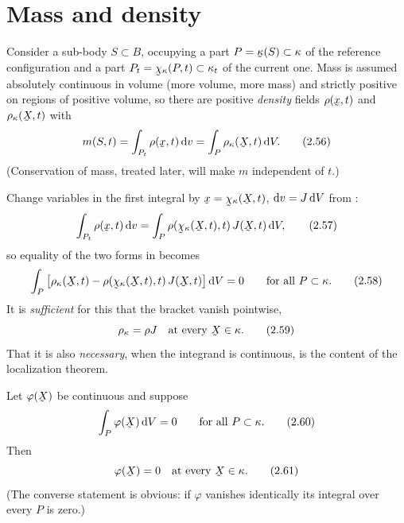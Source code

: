 \section{Mass and density}\label{sec:mass}

Consider a sub-body $S\subset B$, occupying a part $P=\bkappa(S)\subset\kappa$
of the reference configuration and a part $P_t=\bchi_\kappa(P,t)\subset\kappa_t$
of the current one. Mass is assumed absolutely continuous in volume (more
volume, more mass) and strictly positive on regions of positive volume, so
there are positive \emph{density} fields $\rho(\bx,t)$ and $\rho_\kappa(\bX,t)$
with
\begin{equation}
   m(S,t)=\int_{P_t}\rho(\bx,t)\,\dl v=\int_{P}\rho_\kappa(\bX,t)\,\dl V. \tag{2.56}\label{eq:2.56}
\end{equation}
(Conservation of mass, treated later, will make $m$ independent of $t$.)

Change variables in the first integral by $\bx=\bchi_\kappa(\bX,t)$,
$\mathrm{d} v=J\,\mathrm{d} V$ from :
\begin{equation}
   \int_{P_t}\rho(\bx,t)\,\dl v=\int_{P}\rho(\bchi_\kappa(\bX,t),t)\,J(\bX,t)\,\dl V,
   \tag{2.57}\label{eq:2.57}
\end{equation}
so equality of the two forms in  becomes
\begin{equation}
   \int_{P}\big[\rho_\kappa(\bX,t)-\rho(\bchi_\kappa(\bX,t),t)\,J(\bX,t)\big]\,\dl V=0
   \qquad\text{for all }P\subset\kappa. \tag{2.58}\label{eq:2.58}
\end{equation}
It is \emph{sufficient} for this that the bracket vanish pointwise,
\begin{equation}
   \rho_\kappa=\rho J\quad\text{at every }\bX\in\kappa. \tag{2.59}\label{eq:2.59}
\end{equation}
That it is also \emph{necessary}, when the integrand is continuous, is the
content of the localization theorem.

\begin{theorem}[Localization]\label{thm:localization}
Let $\varphi(\bX)$ be continuous and suppose
\begin{equation}
   \int_{P}\varphi(\bX)\,\dl V=0\qquad\text{for all }P\subset\kappa. \tag{2.60}\label{eq:2.60}
\end{equation}
Then
\begin{equation}
   \varphi(\bX)=0\quad\text{at every }\bX\in\kappa. \tag{2.61}\label{eq:2.61}
\end{equation}
\textup{(The converse statement is obvious: if $\varphi$ vanishes
identically its integral over every $P$ is zero.)}
\end{theorem}

